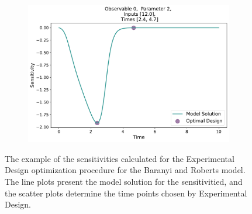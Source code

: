 \documentclass[10pt,A4paper]{article}
\begin{document}
\begin{figure}[H]
      \begin{subfigure}{.9\textwidth}
          \centering
          \includegraphics[scale=0.35]{Figures/Sensitivity_Results_baranyi_roberts_ode_fisher_determinant_rel_sensit_cont_2times_2temps_001_x_00_p_02.pdf}
      \end{subfigure}
    \caption{{\footnotesize The example of the sensitivities calculated for the Experimental Design optimization procedure for the Baranyi and Roberts model.
    The line plots present the model solution for the sensitivitied, and the scatter plots determine the time points chosen by Experimental Design.}} 
    \label{fig:baranyi_roberts_sensitivities}
    \end{figure}
\end{document}
